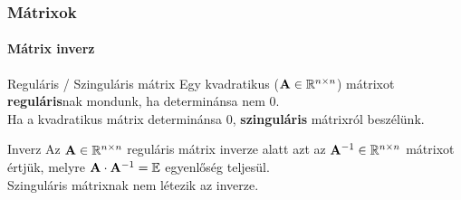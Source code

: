 \documentclass[xcolor={table}]{beamer}
\begin{document}
\begin{frame}
  \frametitle{Mátrixok}
  \framesubtitle{Mátrix inverz}

  \vfill

  \begin{block}{Reguláris / Szinguláris mátrix}
    Egy kvadratikus ($\mathbf{A} \in \mathbb R^{n \times n}$) mátrixot
    \textbf{reguláris}nak mondunk, ha determinánsa nem 0.
    \\[3mm]
    Ha a kvadratikus mátrix determinánsa 0, \textbf{szinguláris} mátrixról
    beszélünk.
  \end{block}

  \vfill

  \begin{block}{Inverz}
    Az $\mathbf{A} \in \mathbb R^{n \times n}$ reguláris mátrix inverze alatt azt
    az $\mathbf{A}^{-1} \in \mathbb R^{n \times n}$ mátrixot értjük, melyre
    $\mathbf{A} \cdot \mathbf{A}^{-1} = {\mathbb{E}}$ egyenlőség teljesül.
    \\[3mm]
    Szinguláris mátrixnak nem létezik az inverze.
  \end{block}

  \vfill
\end{frame}
\end{document}
